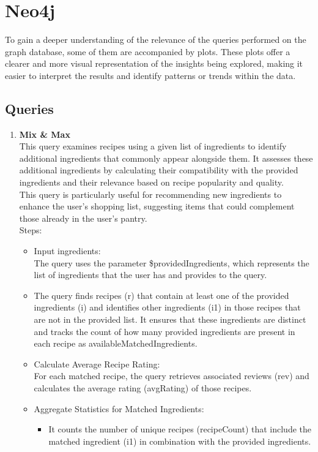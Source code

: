 
\section{Neo4j}
To gain a deeper understanding of the relevance of the queries performed on the graph database, some of them are accompanied by plots. These plots offer a clearer and more visual representation of the insights being explored, making it easier to interpret the results and identify patterns or trends within the data.
\subsection{Queries}
\begin{enumerate}
    \item {}
          \textbf{Mix \& Max}\\
This query examines recipes using a given list of ingredients to identify additional ingredients that commonly appear alongside them. It assesses these additional ingredients by calculating their compatibility with the provided ingredients and their relevance based on recipe popularity and quality.
\\
This query is particularly useful for recommending new ingredients to enhance the user's shopping list, suggesting items that could complement those already in the user's pantry.\\
Steps:
\begin{itemize}
    \item Input ingredients: \\
    The query uses the parameter \$providedIngredients, which represents the list of ingredients that the user has and provides to the query.
    \item The query finds recipes (r) that contain at least one of the provided ingredients (i) and identifies other ingredients (i1) in those recipes that are not in the provided list. It ensures that these ingredients are distinct and tracks the count of how many provided ingredients are present in each recipe as availableMatchedIngredients.
    \item Calculate Average Recipe Rating:\\
    For each matched recipe, the query retrieves associated reviews (rev) and calculates the average rating (avgRating) of those recipes.
    \item Aggregate Statistics for Matched Ingredients:
    \begin{itemize}
        \item It counts the number of unique recipes (recipeCount) that include the matched ingredient (i1) in combination with the provided ingredients.

\end{itemize}
\end{itemize}
\end{enumerate}
